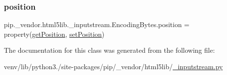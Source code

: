 \subsubsection{\texorpdfstring{position}{position}}
{\footnotesize\ttfamily pip.\+\_\+vendor.\+html5lib.\+\_\+inputstream.\+Encoding\+Bytes.\+position = property(\hyperlink{classpip_1_1__vendor_1_1html5lib_1_1__inputstream_1_1EncodingBytes_a12c343802ad385d8c1fc0312dc53e946}{get\+Position}, \hyperlink{classpip_1_1__vendor_1_1html5lib_1_1__inputstream_1_1EncodingBytes_a92f1071710b0a4c5c8524a1821fe698b}{set\+Position})\hspace{0.3cm}{\ttfamily [static]}}



The documentation for this class was generated from the following file\+:\begin{DoxyCompactItemize}
\item 
venv/lib/python3./site-\/packages/pip/\+\_\+vendor/html5lib/\hyperlink{__inputstream_8py}{\+\_\+inputstream.\+py}\end{DoxyCompactItemize}
